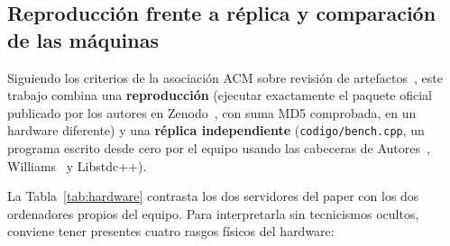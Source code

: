 \documentclass[11pt,a4paper]{article}
\begin{document}
\subsection{Reproducción frente a réplica y comparación de las máquinas}
Siguiendo los criterios de la asociación ACM sobre revisión de artefactos~\cite{acm2020badging}, este trabajo combina una \textbf{reproducción} (ejecutar exactamente el paquete oficial publicado por los autores en Zenodo~\cite{dewolff2024artifact}, con suma MD5 comprobada, en un hardware diferente) y una \textbf{réplica independiente} (\texttt{codigo/bench.cpp}, un programa escrito desde cero por el equipo usando las cabeceras de Autores~\cite{dewolff2024repo}, Williams~\cite{williams2012concurrency} y Libstdc++).

La Tabla~\ref{tab:hardware} contrasta los dos servidores del paper con los dos ordenadores propios del equipo. Para interpretarla sin tecnicismos ocultos, conviene tener presentes cuatro rasgos físicos del hardware:
\end{document}
